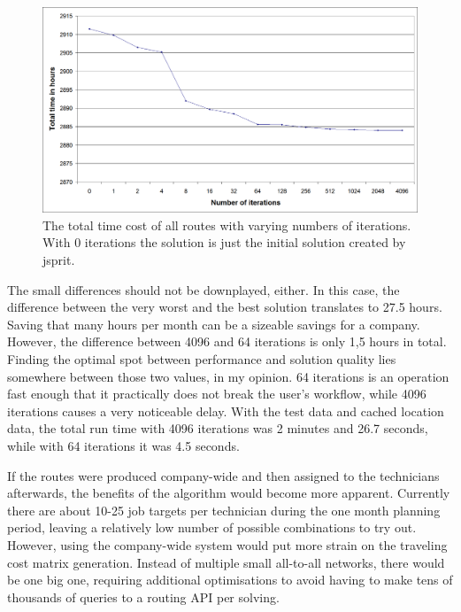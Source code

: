 \begin{figure}[h]
  \begin{center}
    \includegraphics[width=\textwidth]{images/iterations.png}
    \caption{The total time cost of all routes with varying numbers of iterations. With 0 iterations the solution is just the initial solution created by jsprit.}
    \label{fig:iterations}
  \end{center}
\end{figure} 

The small differences should not be downplayed, either. In this case, the difference between the very worst and the best solution translates to 27.5 hours. Saving that many hours per month can be a sizeable savings for a company. However, the difference between 4096 and 64 iterations is only 1,5 hours in total. Finding the optimal spot between performance and solution quality lies somewhere between those two values, in my opinion. 64 iterations is an operation fast enough that it practically does not break the user's workflow, while 4096 iterations causes a very noticeable delay. With the test data and cached location data, the total run time with 4096 iterations was 2 minutes and 26.7 seconds, while with 64 iterations it was 4.5 seconds.

If the routes were produced company-wide and then assigned to the technicians afterwards, the benefits of the algorithm would become more apparent. Currently there are about 10-25 job targets per technician during the one month planning period, leaving a relatively low number of possible combinations to try out. However, using the company-wide system would put more strain on the traveling cost matrix generation. Instead of multiple small all-to-all networks, there would be one big one, requiring additional optimisations to avoid having to make tens of thousands of queries to a routing API per solving.   




